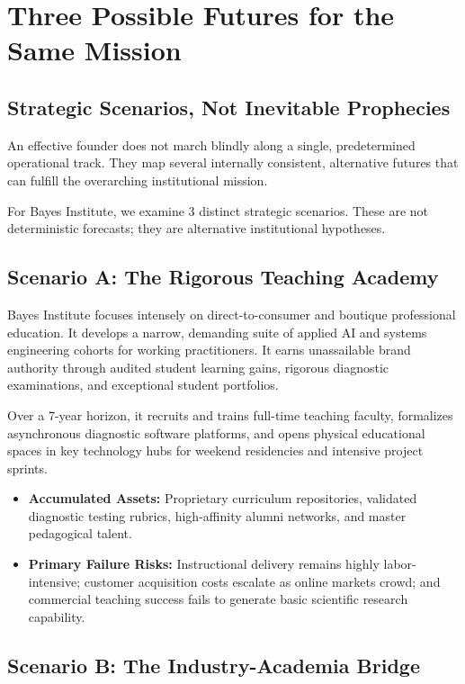 \section{Three Possible Futures for the Same Mission}

\subsection{Strategic Scenarios, Not Inevitable Prophecies}

An effective founder does not march blindly along a single, predetermined operational track. They map several internally consistent, alternative futures that can fulfill the overarching institutional mission.

For Bayes Institute, we examine 3 distinct strategic scenarios. These are not deterministic forecasts; they are alternative institutional hypotheses.

\subsection{Scenario A: The Rigorous Teaching Academy}

Bayes Institute focuses intensely on direct-to-consumer and boutique professional education. It develops a narrow, demanding suite of applied AI and systems engineering cohorts for working practitioners. It earns unassailable brand authority through audited student learning gains, rigorous diagnostic examinations, and exceptional student portfolios.

Over a 7-year horizon, it recruits and trains full-time teaching faculty, formalizes asynchronous diagnostic software platforms, and opens physical educational spaces in key technology hubs for weekend residencies and intensive project sprints.

\begin{itemize}[leftmargin=11pt,itemsep=1.5pt,topsep=1.5pt,parsep=0pt]
  \item \textbf{Accumulated Assets:} Proprietary curriculum repositories, validated diagnostic testing rubrics, high-affinity alumni networks, and master pedagogical talent.
  \item \textbf{Primary Failure Risks:} Instructional delivery remains highly labor-intensive; customer acquisition costs escalate as online markets crowd; and commercial teaching success fails to generate basic scientific research capability.
\end{itemize}

\subsection{Scenario B: The Industry-Academia Bridge}

